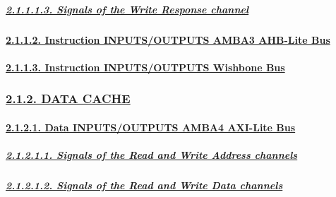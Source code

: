 \documentclass[
]{article}
\begin{document}
\hypertarget{signals-of-the-write-response-channel}{%
\subparagraph{\texorpdfstring{\protect\hyperlink{signals-of-the-write-response-channel-2}{2.1.1.1.3.
Signals of the Write Response
channel}}{2.1.1.1.3. Signals of the Write Response channel}}\label{signals-of-the-write-response-channel}}

\hypertarget{instruction-inputsoutputs-amba3-ahb-lite-bus}{%
\paragraph{\texorpdfstring{\protect\hyperlink{instruction-inputsoutputs-amba3-ahb-lite-bus-1}{2.1.1.2.
Instruction INPUTS/OUTPUTS AMBA3 AHB-Lite
Bus}}{2.1.1.2. Instruction INPUTS/OUTPUTS AMBA3 AHB-Lite Bus}}\label{instruction-inputsoutputs-amba3-ahb-lite-bus}}

\hypertarget{instruction-inputsoutputs-wishbone-bus}{%
\paragraph{\texorpdfstring{\protect\hyperlink{instruction-inputsoutputs-wishbone-bus-1}{2.1.1.3.
Instruction INPUTS/OUTPUTS Wishbone
Bus}}{2.1.1.3. Instruction INPUTS/OUTPUTS Wishbone Bus}}\label{instruction-inputsoutputs-wishbone-bus}}

\hypertarget{data-cache}{%
\subsubsection{\texorpdfstring{\protect\hyperlink{data-cache-1}{2.1.2.
DATA CACHE}}{2.1.2. DATA CACHE}}\label{data-cache}}

\hypertarget{data-inputsoutputs-amba4-axi-lite-bus}{%
\paragraph{\texorpdfstring{\protect\hyperlink{data-inputsoutputs-amba4-axi-lite-bus-1}{2.1.2.1.
Data INPUTS/OUTPUTS AMBA4 AXI-Lite
Bus}}{2.1.2.1. Data INPUTS/OUTPUTS AMBA4 AXI-Lite Bus}}\label{data-inputsoutputs-amba4-axi-lite-bus}}

\hypertarget{signals-of-the-read-and-write-address-channels-1}{%
\subparagraph{\texorpdfstring{\protect\hyperlink{signals-of-the-read-and-write-address-channels-3}{2.1.2.1.1.
Signals of the Read and Write Address
channels}}{2.1.2.1.1. Signals of the Read and Write Address channels}}\label{signals-of-the-read-and-write-address-channels-1}}

\hypertarget{signals-of-the-read-and-write-data-channels-1}{%
\subparagraph{\texorpdfstring{\protect\hyperlink{signals-of-the-read-and-write-data-channels-3}{2.1.2.1.2.
Signals of the Read and Write Data
channels}}{2.1.2.1.2. Signals of the Read and Write Data channels}}\label{signals-of-the-read-and-write-data-channels-1}}
\end{document}
